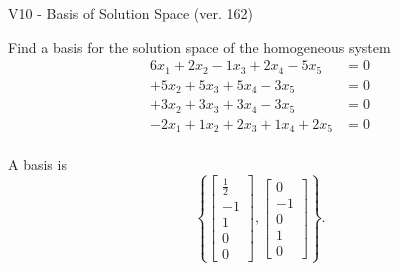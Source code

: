 \begin{exercise}
  \begin{exerciseTitle}V10 - Basis of Solution Space (ver. 162)\end{exerciseTitle}
  \begin{exerciseStatement}
    Find a basis for the solution space of the homogeneous system 
\begin{align*}
 6 x_ 1 + 2 x_ 2 -1 x_ 3 + 2 x_ 4 -5 x_ 5 &= 0  \\ 
  + 5 x_ 2 + 5 x_ 3 + 5 x_ 4 -3 x_ 5 &= 0  \\ 
  + 3 x_ 2 + 3 x_ 3 + 3 x_ 4 -3 x_ 5 &= 0  \\ 
  -2 x_ 1 + 1 x_ 2 + 2 x_ 3 + 1 x_ 4 + 2 x_ 5 &= 0  \\ 
 \end{align*}


 
  \end{exerciseStatement}

  \begin{exerciseAnswer}
   A basis is   
\[\left\{\left[\begin{array}{c}
\frac{1}{2} \\
-1 \\
1 \\
0 \\
0
\end{array}\right] , \left[\begin{array}{c}
0 \\
-1 \\
0 \\
1 \\
0
\end{array}\right]\right\}.\]

  


  \end{exerciseAnswer}
\end{exercise}